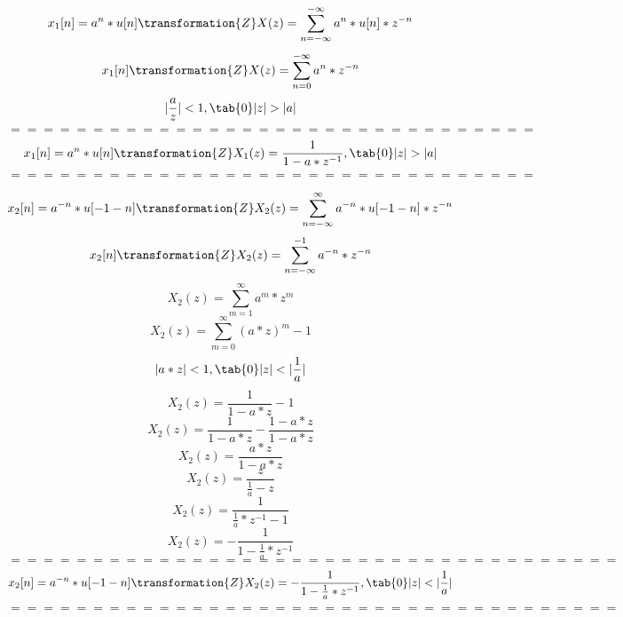 \begin{Udledninger}
\begin{underrubrik}
        \[x_1[n] = a^n*u[n] \transformation{Z} X(z) = \sum_{n=-\infty}^{-\infty}  {a^n*u[n]*z^{-n}} \]
        \[x_1[n] \transformation{Z} X(z) = \sum_{n=0}^{-\infty}                        {a^n*z^{-n}} \]
        \[|\frac{a}{z}| < 1, \tab{0} |z| > |a|                                                         \]
        \[================================                                                          \]
        \[x_1[n] = a^n*u[n] \transformation{Z} X_1(z) = \frac{1}{1 - a*z^{-1}}, \tab{0} |z| > |a|      \]
        \[================================                                                          \]
    \end{underrubrik}
    \begin{underrubrik}
        \[x_2[n] = a^{-n}*u[-1-n] \transformation{Z} X_2(z) = \sum_{n=-\infty}^{\infty} {a^{-n}*u[-1-n]*z^{-n}}                     \]
        \[x_2[n] \transformation{Z} X_2(z) = \sum_{n=-\infty}^{-1}                      {a^{-n}*z^{-n}}                             \]
        \[X_2(z) = \sum_{m = 1}^{\infty}                                                {a^{m}*z^{m}}                               \]
        \[X_2(z) = \sum_{m = 0}^{\infty}                                                {(a*z)^m}                                - 1\]
        \[|a*z| < 1, \tab{0} |z| < |\frac{1}{a}|                                                                                       \]
        \[X_2(z) = \frac{1}{1 - a*z} - 1                                                                                            \]
        \[X_2(z) = \frac{1}{1 - a*z} - \frac{1 - a*z}{1 - a*z}                                                                      \]
        \[X_2(z) = \frac{a*z}{1 - a*z}                                                                                              \]
        \[X_2(z) = \frac{z}{\frac{1}{a} - z}                                                                                        \]
        \[X_2(z) = \frac{1}{\frac{1}{a}*z^{-1} - 1}                                                                                 \]
        \[X_2(z) = -\frac{1}{1 - \frac{1}{a}*z^{-1}}                                                                                \]
        \[=====================================                                                                                     \]
        \[x_2[n] = a^{-n}*u[-1-n] \transformation{Z} X_2(z) = -\frac{1}{1 - \frac{1}{a}*z^{-1}}, \tab{0} |z| < |\frac{1}{a}|           \]
        \[=====================================                                                                                     \]


\end{underrubrik}
\end{Udledninger}
